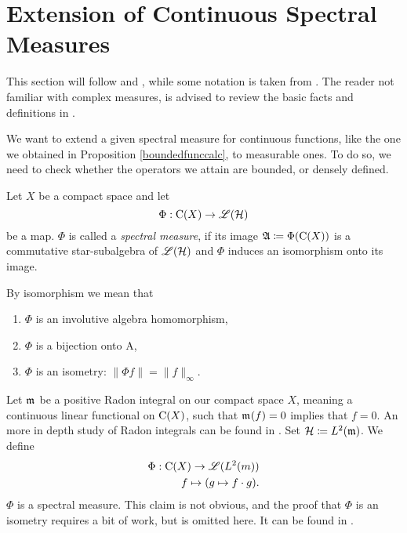 
\section{Extension of Continuous Spectral Measures}

This section will follow \cite{LesHaupt} and \cite[pp. 341- 345]{RudinFuncAna}
, while some notation
is taken from \cite[Ch. 6]{PedAnaN}. The reader not familiar
with complex measures, is advised to review the basic facts
and definitions in 
\cite[Ch. 6]{RudinRealComp}.

We want to extend a given spectral measure for continuous functions,
like the one we obtained in Proposition \ref{boundedfunccalc}, to measurable ones. 
To do so, we need to check whether the operators we attain
are bounded, or densely defined.
\begin{defi}
 
 Let $X$ be a compact space and let
 \[
  \Phi : \operatorname{C} (X) \to \mathscr{L}(\mathcal{H})
 \]
be a map. $\Phi$ is called a \textit{spectral measure}, if its image 
$\mathfrak{A} \coloneqq \Phi(\operatorname{C} (X))$ is a commutative star-subalgebra of $\mathscr{L}(\mathcal{H})$ and 
$\Phi$ induces an isomorphism onto its image.
\end{defi}

\begin{rem}
 By isomorphism we mean that
 \begin{enumerate}
  \item $\Phi$ is an involutive algebra homomorphism,
  \item $\Phi$ is a bijection onto A,
  \item $\Phi$ is an isometry: $\| \Phi f \| = \| f \|_\infty$.
 \end{enumerate}

\end{rem}

\begin{expl}
Let $\mathfrak{m}_{}$ be a positive Radon integral on our compact space $X$, meaning a
continuous linear functional on $\operatorname{C} (X)$, such that $\mathfrak{m}_{}(f) = 0$ implies 
that $f=0$. An more in depth study of Radon integrals can be found in 
\cite[Chapter~6.1]{PedAnaN}. Set $\mathcal{H} \coloneqq L^2(\mathfrak{m})$.
We define 
\begin{align*}
 \Phi : \operatorname{C}(X) \to \mathscr{L}({L^2({m})}) \\
 f \mapsto (g \mapsto f\cdot g).
\end{align*}
$\Phi$ is a spectral measure. This claim is not obvious, and the proof
that $\Phi$ is an isometry requires a bit of work, but is omitted here.
It can be found in \cite{LesHaupt}. 
\end{expl}

